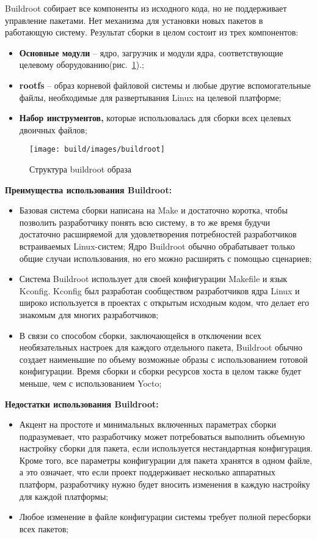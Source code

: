 Buildroot собирает все компоненты из исходного кода, но не поддерживает управление пакетами. Нет механизма для установки новых пакетов в работающую систему.
Результат сборки в целом состоит из трех компонентов:
\begin{itemize}
  \item \textbf{Основные модули} -- ядро, загрузчик и модули ядра, соответствующие целевому оборудованию(рис.~\ref{fig:buildroot}).;
  \item \textbf{rootfs} -- образ корневой файловой системы и любые другие вспомогательные файлы, необходимые для развертывания Linux на целевой платформе;
  \item \textbf{Набор инструментов,} которые использовалась для сборки всех целевых двоичных файлов;
\end{itemize}

\begin{figure}[h!]
  \centering
  \setlength{\fboxsep}{5pt}
  \texttt{[image: build/images/buildroot]}
  \caption{Структура buildroot образа}\label{fig:buildroot}
\end{figure}

\textbf{Преимущества использования Buildroot:}
\begin{itemize}
  \item Базовая система сборки написана на Make\cite{BUILDROOT} и достаточно коротка, чтобы позволить разработчику понять всю систему, в то же время будучи достаточно расширяемой для удовлетворения потребностей разработчиков встраиваемых Linux-систем;
Ядро Buildroot обычно обрабатывает только общие случаи использования, но его можно расширять с помощью сценариев;
  \item Система Buildroot использует для своей конфигурации Makefile и язык Kconfig\cite{BUILDROOT}. Kconfig был разработан сообществом разработчиков ядра Linux\cite{KCONFIG} и широко используется в проектах с открытым исходным кодом, что делает его знакомым для многих разработчиков;
  \item В связи со способом сборки, заключающейся в отключении всех необязательных настроек для каждого отдельного пакета, Buildroot обычно создает наименьшие по объему возможные образы с использованием готовой конфигурации.
Время сборки и сборки ресурсов хоста в целом также будет меньше, чем с использованием Yocto;
\end{itemize}

\textbf{Недостатки использования Buildroot:}
\begin{itemize}
  \item Акцент на простоте и минимальных включенных параметрах сборки подразумевает, что разработчику может потребоваться выполнить объемную настройку сборки для пакета, если используется нестандартная конфигурация. Кроме того, все параметры конфигурации для пакета хранятся в одном файле\cite{BUILDROOT}, а это означает, что если проект поддерживает несколько аппаратных платформ, разработчику нужно будет вносить изменения в каждую настройку для каждой платформы;
  \item Любое изменение в файле конфигурации системы требует полной пересборки всех пакетов;
\end{itemize}

